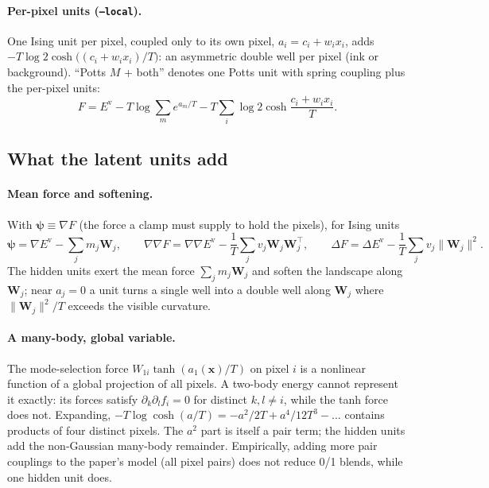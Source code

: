 \documentclass[11pt,a4paper]{article}
\newcommand{\vx}{\bm{x}}
\newcommand{\Ev}{E^{\mathrm{v}}}
\newcommand{\grad}{\nabla}
\begin{document}
\paragraph{Per-pixel units (\texttt{--local}).} One Ising unit per pixel, coupled only to its own pixel,
$a_i=c_i+w_ix_i$, adds $-T\log2\cosh\big((c_i+w_ix_i)/T\big)$: an asymmetric double well per pixel (ink or
background). ``Potts $M$ + both'' denotes one Potts unit with spring coupling plus the per-pixel units:
\begin{equation}
  F=\Ev-T\log\sum_me^{a_m/T}-T\sum_i\log2\cosh\frac{c_i+w_ix_i}{T}.
  \label{eq:Fboth}
\end{equation}

\subsection{What the latent units add}
\paragraph{Mean force and softening.} With $\bm\psi\equiv\grad F$ (the force a clamp must supply to hold the
pixels), for Ising units
\begin{equation}
  \bm\psi=\grad\Ev-\sum_jm_j\bm W_j,\qquad
  \grad\grad F=\grad\grad\Ev-\frac1T\sum_jv_j\bm W_j\bm W_j^{\!\top},\qquad
  \Delta F=\Delta\Ev-\frac1T\sum_jv_j\|\bm W_j\|^2 .
\end{equation}
The hidden units exert the mean force $\sum_jm_j\bm W_j$ and soften the landscape along $\bm W_j$; near $a_j=0$ a unit
turns a single well into a double well along $\bm W_j$ where $\|\bm W_j\|^2/T$ exceeds the visible curvature.

\paragraph{A many-body, global variable.} The mode-selection force $W_{1i}\tanh(a_1(\vx)/T)$ on pixel $i$ is a
nonlinear function of a global projection of all pixels. A two-body energy cannot represent it exactly: its
forces satisfy $\partial_k\partial_l f_i=0$ for distinct $k,l\neq i$, while the tanh force does not. Expanding,
$-T\log\cosh(a/T)=-a^2/2T+a^4/12T^3-\dots$ contains products of four distinct pixels. The $a^2$ part is itself a pair
term; the hidden units add the non-Gaussian many-body remainder. Empirically, adding more pair couplings to the
paper's model (all pixel pairs) does not reduce 0/1 blends, while one hidden unit does.
\end{document}
